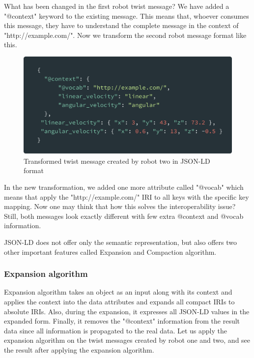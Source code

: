		What has been changed in the first robot twist message? We have added a "@context" keyword to the existing message. This means that, whoever consumes this message, they have to understand the complete message in the context of "http://example.com/". Now we transform the second robot message format like this.
		
		\begin{figure}[!htbp] 
			\begin{center}
				\includegraphics[scale=0.1]{./images/png/jsonld/4}	
				\caption{Transformed twist message created by robot two in JSON-LD format}	
				\label{fig:jsonld_4}	
			\end{center}
		\end{figure}	
	
		In the new transformation, we added one more attribute called "@vocab" which means that apply the "http://example.com/" IRI to all keys with the specific key mapping. Now one may think that how this solves the interoperability issue? Still, both messages look exactly different with few extra @context and @vocab information.
		
		JSON-LD does not offer only the semantic representation, but also offers two other important features called Expansion and Compaction algorithm.
		
	\subsubsection{Expansion algorithm}
		
	Expansion algorithm takes an object as an input along with its context and applies the context into the data attributes and expands all compact IRIs to absolute IRIs. Also, during the expansion, it expresses all JSON-LD values in the expanded form. Finally, it removes the "@context" information from the result data since all information is propagated to the real data. Let us apply the expansion algorithm on the twist messages created by robot one and two, and see the result after applying the expansion algorithm.

